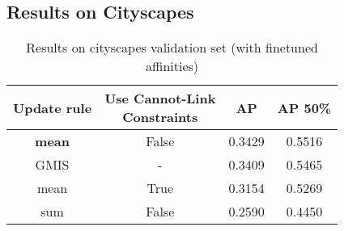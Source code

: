 \subsection{Results on Cityscapes}

\begin{table*}
    \centering
    \begin{subtable}[t!]{0.98\textwidth}\centering
        \begin{tabular}{c| c| c | c}
        Update rule & \makecell{Use Cannot-Link\\Constraints} & AP & AP 50\%\\ \midrule\midrule
\textbf{mean} & False & {\color{ForestGreen} 0.3429 } & {\color{ForestGreen} 0.5516 } \\
GMIS & - & {\color{ForestGreen} 0.3409 } & {\color{ForestGreen} 0.5465 } \\
mean & True & {\color{Orange} 0.3154 } & {\color{Orange} 0.5269 } \\
sum & False & {\color{Red} 0.2590 } & {\color{Red} 0.4450 } \\


        \end{tabular}
    \end{subtable} 
    \caption{Results on cityscapes validation set (with finetuned affinities)}
    \label{tab:linkage-criteria}
\end{table*}


